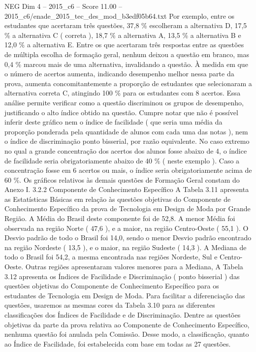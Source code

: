 \begin{textsample}{NEG Dim 4 – 2015\_c6 – Score 11.00 – 2015\_c6/enade\_2015\_tec\_des\_mod\_b3edf05b64.txt}
Por exemplo, entre os estudantes que acertaram três questões, 37,8 \% escolheram a alternativa D, 17,5 \% a alternativa C ( correta ), 18,7 \% a alternativa A, 13,5 \% a alternativa B e 12,0 \% a alternativa E.
Entre os que acertaram três respostas entre as questões de múltipla escolha de formação geral, nenhum deixou a questão em branco, mas 0,4 \% marcou mais de uma alternativa, invalidando a questão.
À medida em que o número de acertos aumenta, indicando desempenho melhor nessa parte da prova, aumenta concomitantemente a proporção de estudantes que selecionaram a alternativa correta C, atingindo 100 \% para os estudantes com 8 acertos.
Essa análise permite verificar como a questão discriminou os grupos de desempenho, justificando o alto índice obtido na questão.
Cumpre notar que não é possível inferir deste gráfico nem o índice de facilidade ( que seria uma média da proporção ponderada pela quantidade de alunos com cada uma das notas ), nem o índice de discriminação ponto bisserial, por razão equivalente.
No caso extremo no qual a grande concentração dos acertos dos alunos fosse abaixo de 4, o índice de facilidade seria obrigatoriamente abaixo de 40 \% ( neste exemplo ).
Caso a concentração fosse em 6 acertos ou mais, o índice seria obrigatoriamente acima de 60 \%.
Os gráficos relativos às demais questões de Formação Geral constam do Anexo I. 3.2.2 Componente de Conhecimento Específico A Tabela 3.11 apresenta as Estatísticas Básicas em relação às questões objetivas do Componente de Conhecimento Específico da prova de Tecnologia em Design de Moda por Grande Região.
A Média do Brasil deste componente foi de 52,8.
A menor Média foi observada na região Norte ( 47,6 ), e a maior, na região Centro-Oeste ( 55,1 ).
O Desvio padrão de todo o Brasil foi 14,0, sendo o menor Desvio padrão encontrado na região Nordeste ( 13,5 ), e o maior, na região Sudeste ( 14,3 ).
A Mediana de todo o Brasil foi 54,2, a mesma encontrada nas regiões Nordeste, Sul e Centro-Oeste.
Outras regiões apresentaram valores menores para a Mediana, A Tabela 3.12 apresenta os Índices de Facilidade e Discriminação ( ponto bisserial ) das questões objetivas do Componente de Conhecimento Específico para os estudantes de Tecnologia em Design de Moda.
Para facilitar a diferenciação das questões, usaremos as mesmas cores da Tabela 3.10 para as diferentes classificações dos Índices de Facilidade e de Discriminação.
Dentre as questões objetivas da parte da prova relativa ao Componente de Conhecimento Específico, nenhuma questão foi anulada pela Comissão.
Desse modo, a classificação, quanto ao Índice de Facilidade, foi estabelecida com base em todas as 27 questões.

\end{textsample}
